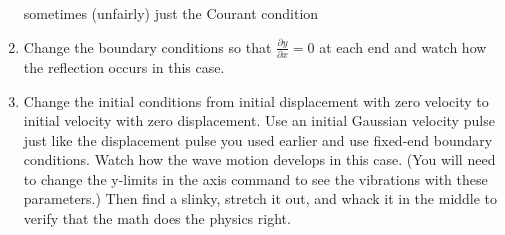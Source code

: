 \documentclass{book}
\theoremstyle{plain}
\theoremstyle{definition}
\numberwithin{exm}{chapter}
\theoremstyle{remark}
\theoremstyle{summary}
\theoremstyle{overview}
\begin{document}
\begin{enumerate}[label=(\alph*)]
sometimes (unfairly) just the Courant condition
\item Change the boundary conditions so that $ \frac{\partial y}{\partial x} = 0 $ at each end and watch
how the reflection occurs in this case.
\item Change the initial conditions from initial displacement with zero
velocity to initial velocity with zero displacement. Use an initial Gaussian velocity pulse just like the displacement pulse you used earlier
and use fixed-end boundary conditions. Watch how the wave motion
develops in this case. (You will need to change the y-limits in the axis
command to see the vibrations with these parameters.) Then find a
slinky, stretch it out, and whack it in the middle to verify that the math
does the physics right.

\end{enumerate}
\end{document}
